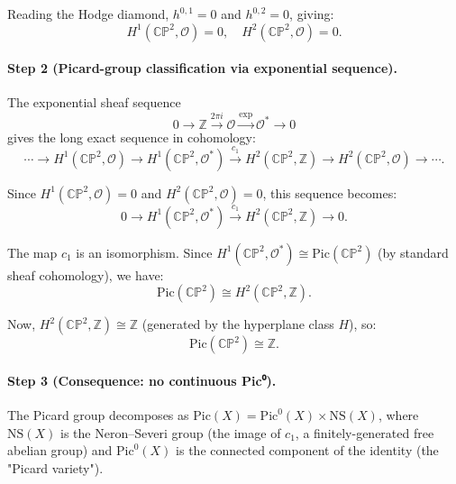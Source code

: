 Reading the Hodge diamond, $h^{0,1} = 0$ and $h^{0,2} = 0$, giving:
\begin{equation}
H^1(\mathbb{CP}^2, \mathcal{O}) = 0, \quad H^2(\mathbb{CP}^2, \mathcal{O}) = 0.
\end{equation}

\paragraph{Step 2 (Picard-group classification via exponential sequence).}
The exponential sheaf sequence
\begin{equation}
0 \to \mathbb{Z} \xrightarrow{2\pi i} \mathcal{O} \xrightarrow{\exp} \mathcal{O}^*
\to 0
\end{equation}
gives the long exact sequence in cohomology:
\begin{equation}
\cdots \to H^1(\mathbb{CP}^2, \mathcal{O}) \to H^1(\mathbb{CP}^2, \mathcal{O}^*)
\xrightarrow{c_1} H^2(\mathbb{CP}^2, \mathbb{Z}) \to H^2(\mathbb{CP}^2, \mathcal{O})
\to \cdots.
\end{equation}

Since $H^1(\mathbb{CP}^2, \mathcal{O}) = 0$ and $H^2(\mathbb{CP}^2, \mathcal{O}) = 0$,
this sequence becomes:
\begin{equation}
0 \to H^1(\mathbb{CP}^2, \mathcal{O}^*) \xrightarrow{c_1} H^2(\mathbb{CP}^2, \mathbb{Z})
\to 0.
\end{equation}

The map $c_1$ is an isomorphism. Since $H^1(\mathbb{CP}^2, \mathcal{O}^*) \cong
\mathrm{Pic}(\mathbb{CP}^2)$ (by standard sheaf cohomology), we have:
\begin{equation}
\mathrm{Pic}(\mathbb{CP}^2) \cong H^2(\mathbb{CP}^2, \mathbb{Z}).
\end{equation}

Now, $H^2(\mathbb{CP}^2, \mathbb{Z}) \cong \mathbb{Z}$ (generated by the hyperplane
class $H$), so:
\begin{equation}
\mathrm{Pic}(\mathbb{CP}^2) \cong \mathbb{Z}.
\end{equation}

\paragraph{Step 3 (Consequence: no continuous Pic⁰).}
The Picard group decomposes as $\mathrm{Pic}(X) = \mathrm{Pic}^0(X) \times
\mathrm{NS}(X)$, where $\mathrm{NS}(X)$ is the Neron–Severi group (the image
of $c_1$, a finitely-generated free abelian group) and $\mathrm{Pic}^0(X)$ is the
connected component of the identity (the "Picard variety").


